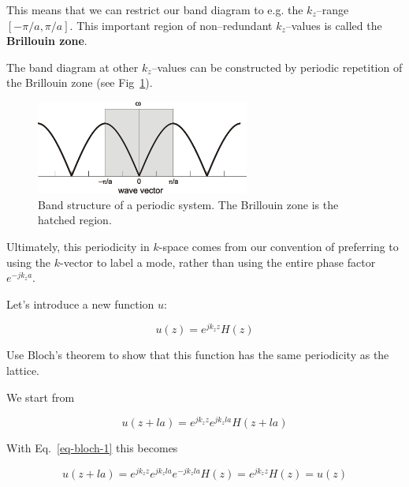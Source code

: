 This means that we can restrict our band diagram to e.g. the $k_z$--range $[-\pi/a,\pi/a]$. This important region of non--redundant $k_z$--values is called the \textbf{Brillouin zone}.

The band diagram at other $k_z$--values can be constructed by periodic repetition of the Brillouin zone (see Fig~\ref{fig-band-folding}).

\begin{figure}[H]
\centering
\includegraphics[width=7cm]{symmetry/figures/band_folding}
\caption{Band structure of a periodic system. The Brillouin zone is the hatched region.}
\label{fig-band-folding}
\end{figure}

Ultimately, this periodicity in $k$-space comes from our convention of preferring to using the $k$-vector to label a mode, rather than using the entire phase factor $ e^{-j k_z a}$. 

\pagebreak


Let's introduce a new function $u$:

\begin{equation}
u(z) = e^{j k_z z} H(z) \label{eq-bloch-u}
\end{equation} 

\begin{cue}
Use Bloch's theorem to show that this function has the same periodicity as the lattice.
\end{cue}

\noindent{}We start from

\begin{equation}
u(z+la)= e^{j k_z z} e^{j k_z l a} H(z + l a)
\end{equation} 

With Eq.~\ref{eq-bloch-1} this becomes

\begin{equation}
u(z+l a)= e^{j k_z z} e^{j k_z l a} e^{-j k_z l a} H(z) = e^{j k_z z} H(z) = u(z)
\end{equation} 

